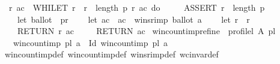 \begin{isabellebody}
\ \ {\isacharparenleft}{\kern0pt}r{\isacharcomma}{\kern0pt}\ ac{\isacharparenright}{\kern0pt}\ {\isasymleftarrow}\ WHILET\ {\isacharparenleft}{\kern0pt}{\isasymlambda}{\isacharparenleft}{\kern0pt}r{\isacharcomma}{\kern0pt}\ {\isacharunderscore}{\kern0pt}{\isacharparenright}{\kern0pt}{\isachardot}{\kern0pt}\ r\ {\isacharless}{\kern0pt}\ length\ p{\isacharparenright}{\kern0pt}\ {\isacharparenleft}{\kern0pt}{\isasymlambda}{\isacharparenleft}{\kern0pt}r{\isacharcomma}{\kern0pt}\ ac{\isacharparenright}{\kern0pt}{\isachardot}{\kern0pt}\ do\ {\isacharbraceleft}{\kern0pt}\isanewline
\ \ \ \ ASSERT\ {\isacharparenleft}{\kern0pt}r\ {\isacharless}{\kern0pt}\ length\ p{\isacharparenright}{\kern0pt}{\isacharsemicolon}{\kern0pt}\isanewline
\ \ \ \ let\ ballot\ {\isacharequal}{\kern0pt}\ {\isacharparenleft}{\kern0pt}p{\isacharbang}{\kern0pt}r{\isacharparenright}{\kern0pt}{\isacharsemicolon}{\kern0pt}\isanewline
\ \ \ \ let\ ac\ {\isacharequal}{\kern0pt}\ ac\ {\isacharplus}{\kern0pt}\ winsr{\isacharunderscore}{\kern0pt}imp{\isacharprime}{\kern0pt}\ ballot\ a{\isacharsemicolon}{\kern0pt}\isanewline
\ \ \ \ let\ r\ {\isacharequal}{\kern0pt}\ r\ {\isacharplus}{\kern0pt}\ {}{\isacharsemicolon}{\kern0pt}\isanewline
\ \ \ \ RETURN\ {\isacharparenleft}{\kern0pt}r{\isacharcomma}{\kern0pt}\ ac{\isacharparenright}{\kern0pt}\isanewline
\ \ {\isacharbraceright}{\kern0pt}{\isacharparenright}{\kern0pt}{\isacharparenleft}{\kern0pt}{}{\isacharcomma}{\kern0pt}{}{\isacharparenright}{\kern0pt}{\isacharsemicolon}{\kern0pt}\isanewline
\ \ RETURN\ ac\isanewline
{\isacharbraceright}{\kern0pt}{\isachardoublequoteclose}\isanewline
\isanewline
\isanewline
{}\isamarkupfalse%
\ win{\isacharunderscore}{\kern0pt}count{\isacharunderscore}{\kern0pt}imp{\isacharprime}{\kern0pt}{\isacharunderscore}{\kern0pt}refine{\isacharcolon}{\kern0pt}\ \ {\isachardoublequoteopen}profile{\isacharunderscore}{\kern0pt}l\ A\ pl{\isachardoublequoteclose}\isanewline
\ \ \ {\isachardoublequoteopen}win{\isacharunderscore}{\kern0pt}count{\isacharunderscore}{\kern0pt}imp{\isacharprime}{\kern0pt}\ pl\ a\ {\isasymle}\ {\isasymDown}Id\ {\isacharparenleft}{\kern0pt}win{\isacharunderscore}{\kern0pt}count{\isacharunderscore}{\kern0pt}imp\ pl\ a{\isacharparenright}{\kern0pt}{\isachardoublequoteclose}\isanewline
%
\isadelimproof
\ \ %
\endisadelimproof
%
\isatagproof
{}\isamarkupfalse%
\ win{\isacharunderscore}{\kern0pt}count{\isacharunderscore}{\kern0pt}imp{\isacharprime}{\kern0pt}{\isacharunderscore}{\kern0pt}def\ win{\isacharunderscore}{\kern0pt}count{\isacharunderscore}{\kern0pt}imp{\isacharunderscore}{\kern0pt}def\ winsr{\isacharunderscore}{\kern0pt}imp{\isacharunderscore}{\kern0pt}def\ wc{\isacharunderscore}{\kern0pt}invar{\isacharunderscore}{\kern0pt}def\isanewline

\end{isabellebody}
